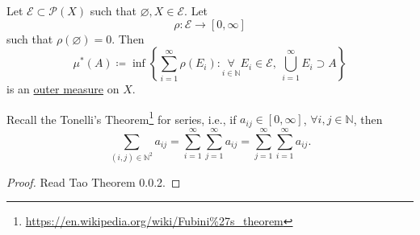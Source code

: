 \begin{proposition}\label{prop:outer-measure}
	Let \(\mathcal{E} \subset \mathcal{P} (X)\) such that \(\varnothing, X \in  \mathcal{E} \). Let
	\[
		\rho\colon \mathcal{E} \to [0, \infty ]
	\]
	such that \(\rho(\varnothing ) = 0\). Then
	\[
		\mu^{\ast} (A) \coloneqq \inf\left\{\sum_{i=1}^{\infty} \rho(E_{i})\colon \underset{i\in \mathbb{N} }{\forall}E_{i}\in \mathcal{E},\ \bigcup_{i=1}^{\infty} E_{i}\supset A\right\}
	\]
	is an \hyperref[def:outer-measure]{outer measure} on \(X\).
\end{proposition}

\begin{theorem}\label{thm:Tonelli-theorem-for-series}
	Recall the Tonelli's Theorem\footnote{\url{https://en.wikipedia.org/wiki/Fubini\%27s_theorem}} for series, i.e., if
	\(a_{ij}\in [0, \infty ]\), \(\forall i, j\in \mathbb{N} \), then
	\[
		\sum_{(i, j)\in\mathbb{N} ^2}a_{ij} = \sum_{i=1}^{\infty} \sum_{j=1}^{\infty} a_{ij} = \sum_{j=1}^{\infty} \sum_{i=1}^{\infty} a_{ij}.
	\]
\end{theorem}
\begin{proof}
	Read Tao\cite{tao2013introduction} Theorem 0.0.2.
\end{proof}